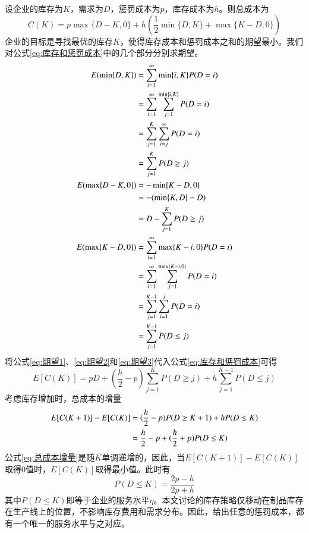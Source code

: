 设企业的库存为$K$，需求为$D$，惩罚成本为$p$，库存成本为$h$。则总成本为
\begin{equation}
C(K) = p\max\{D-K,0\} + h(\frac{1}{2}\min\{D,K\}+\max\{K-D,0\})
\label{eq:库存和惩罚成本}
\end{equation}
企业的目标是寻找最优的库存$K$，使得库存成本和惩罚成本之和的期望最小。我们对公式\ref{eq:库存和惩罚成本}中的几个部分分别求期望。
\begin{align}
E(\min\{D,K\}) &= \sum_{i=1}^{\infty}\min\{i,K\}P(D=i) \notag\\
&= \sum_{i=1}^{\infty}\sum_{j=1}^{\min\{i,K\}}P(D=i) \notag\\
&= \sum_{j=1}^K\sum_{i=j}^{\infty}P(D=i) \notag\\
&= \sum_{j=1}^K P(D \geq j) \label{eq:期望1}\\
E(\max\{D-K,0\}) &= -\min\{K-D,0\} \notag\\
&= -(\min\{K,D\}-D) \notag\\
&= D - \sum_{j=1}^K P(D \geq j) \label{eq:期望2}\\
E(\max\{K-D,0\}) &= \sum_{i=1}^{\infty}\max\{K-i,0\}P(D=i) \notag\\
&= \sum_{i=1}^{\infty}\sum_{j=1}^{\max\{K-i,0\}}P(D=i) \notag\\
&= \sum_{j=1}^{K-1}\sum_{i=1}^j P(D=i) \notag\\
&= \sum_{j=1}^{K-1}P(D \leq j) \label{eq:期望3}
\end{align}
将公式\ref{eq:期望1}、\ref{eq:期望2}和\ref{eq:期望3}代入公式\ref{eq:库存和惩罚成本}可得
\begin{equation}
E[C(K)] = pD + (\frac{h}{2}-p)\sum_{j=1}^K P(D \geq j) + h\sum_{j=1}^{K-1} P(D \leq j)
\label{eq:库存和惩罚成本期望}
\end{equation}
考虑库存增加时，总成本的增量
\begin{align}
E[C(K+1)]-E[C(K)] &= (\frac{h}{2}-p)P(D\geq K+1) + hP(D\leq K) \notag\\
&= \frac{h}{2}-p+(\frac{h}{2}+p)P(D\leq K) \label{eq:总成本增量}
\end{align}
公式\ref{eq:总成本增量}是随$K$单调递增的，因此，当$E[C(K+1)]-E[C(K)]$取得0值时，$E[C(K)]$取得最小值。此时有
\begin{equation}
P(D\leq K) = \frac{2p-h}{2p+h}
\label{eq:惩罚成本与服务水平的关系}
\end{equation}
其中$P(D\leq K)$即等于企业的服务水平$\eta$。本文讨论的库存策略仅移动在制品库存在生产线上的位置，不影响库存费用和需求分布。因此，给出任意的惩罚成本，都有一个唯一的服务水平与之对应。

